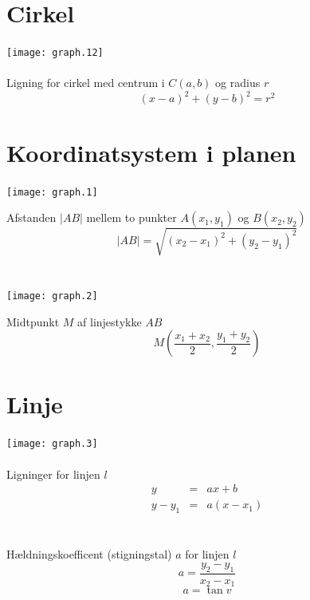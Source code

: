 \documentclass[11pt,a5paper,fleqn,leqno]{book}
\begin{document}
\section{Cirkel}

\texttt{[image: graph.12]}
\\
\\
Ligning for cirkel med centrum i $C(a,b)$ og radius $r$
\begin{equation}
(x-a)^2 + (y-b)^2 = r^2
\end{equation}

\newpage

\section{Koordinatsystem i planen}

\texttt{[image: graph.1]}

Afstanden $|AB|$ mellem to punkter $A(x_1,y_1)$ og $B(x_2,y_2)$
\begin{equation}
|AB| = \sqrt{(x_2-x_1)^2 + (y_2-y_1)^2}
\end{equation}
\\
\\
\texttt{[image: graph.2]}

Midtpunkt $M$ af linjestykke $AB$
\begin{equation}
M\left(\frac{x_1+x_2}{2},\frac{y_1+y_2}{2}\right)
\end{equation}

\vfill

\section{Linje}

\texttt{[image: graph.3]}
\\
\\
Ligninger for linjen $l$
\begin{eqnarray} \label{eq:linje_ligning}
y     & = & ax+b \\
y-y_1 & = & a(x-x_1) \nonumber
\end{eqnarray}
\\
\\
Hældningskoefficent (stigningstal) $a$ for linjen $l$
\begin{equation} \label{eq:linje_haeldning}
a = \frac{y_2 - y_1}{x_2 - x_1}
\end{equation}
\begin{equation}
a = \tan v
\end{equation}
\end{document}
